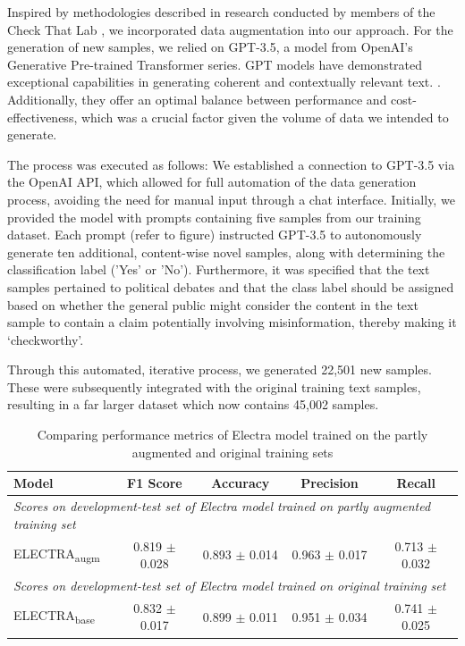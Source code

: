 Inspired by methodologies described in research conducted by members of the Check That Lab \cite{ct_23_033_gptaugmenation}, we incorporated data augmentation into our approach. For the generation of new samples, we relied on GPT-3.5, a model from OpenAI’s Generative Pre-trained Transformer series. GPT models have demonstrated exceptional capabilities in generating coherent and contextually relevant text. \cite{data_aug_gpt_brown2020language}. Additionally, they offer an optimal balance between performance and cost-effectiveness, which was a crucial factor given the volume of data we intended to generate.

The process was executed as follows: We established a connection to GPT-3.5 via the OpenAI API, which allowed for full automation of the data generation process, avoiding the need for manual input through a chat interface. Initially, we provided the model with prompts containing five samples from our training dataset. Each prompt (refer to figure) instructed GPT-3.5 to autonomously generate ten additional, content-wise novel samples, along with determining the classification label ('Yes' or 'No'). Furthermore, it was specified that the text samples pertained to political debates and that the class label should be assigned based on whether the general public might consider the content in the text sample to contain a claim potentially involving misinformation, thereby making it ‘checkworthy’.

Through this automated, iterative process, we generated 22,501 new samples. These were subsequently integrated with the original training text samples, resulting in a far larger dataset which now contains 45,002 samples. 

\begin{table}[h]
    \centering
    \begin{tabular}{l|c|c|c|c}
    \hline
         \textbf{Model} & F1 Score & Accuracy & Precision & Recall \\
    \hline
    \hline
        \multicolumn{5}{l}{\textit{Scores on development-test set of Electra model trained on partly augmented training set}}\\
        ELECTRA\textsubscript{augm} & 0.819 $\pm$ 0.028 & 0.893 $\pm$ 0.014 & 0.963 $\pm$ 0.017 & 0.713 $\pm$ 0.032\\
    \hline
        \multicolumn{5}{l}{\textit{Scores on development-test set of Electra model trained on original training set}}\\
         ELECTRA\textsubscript{base} & 0.832 $\pm$ 0.017 & 0.899 $\pm$ 0.011 & 0.951 $\pm$ 0.034 & 0.741 $\pm$ 0.025\\
    \hline
    \end{tabular}
    \caption{Comparing performance metrics of Electra model trained on the partly augmented and original training sets}
    \label{tab:aug_scores}
\end{table}

